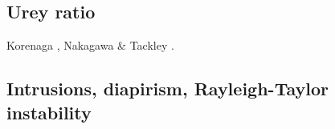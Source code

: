 \subsection{Urey ratio}

\begin{scriptsize}
Korenaga \cite{kore08}, Nakagawa \& Tackley \cite{nata12}. 
\end{scriptsize}

\subsection{Intrusions, diapirism, Rayleigh-Taylor instability}

